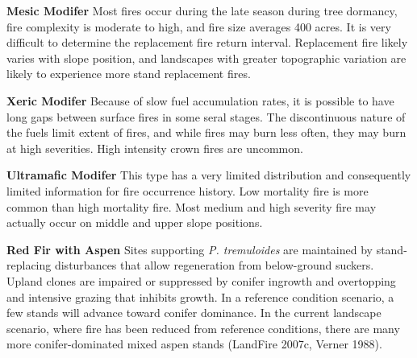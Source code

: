\begin{adjustwidth}{2cm}{}
\textbf{Mesic Modifer } Most fires occur during the late season during tree dormancy, fire complexity is moderate to high, and fire size averages 400 acres. It is very difficult to determine the replacement fire return interval. Replacement fire likely varies with slope position, and landscapes with greater topographic variation are likely to experience more stand replacement fires.

\textbf{Xeric Modifer} Because of slow fuel accumulation rates, it is possible to have long gaps between surface fires in some seral stages. The discontinuous nature of the fuels limit extent of fires, and while fires may burn less often, they may burn at high severities. High intensity crown fires are uncommon.

\textbf{Ultramafic Modifer} This type has a very limited distribution and consequently limited information for fire occurrence history. Low mortality fire is more common than high mortality fire. Most medium and high severity fire may actually occur on middle and upper slope positions.

\end{adjustwidth}

\textbf{Red Fir with Aspen} Sites supporting \emph{P. tremuloides} are maintained by stand-replacing disturbances that allow regeneration from below-ground suckers. Upland clones are impaired or suppressed by conifer ingrowth and overtopping and intensive grazing that inhibits growth. In a reference condition scenario, a few stands will advance toward conifer dominance. In the current landscape scenario, where fire has been reduced from reference conditions, there are many more conifer-dominated mixed aspen stands (LandFire 2007c, Verner 1988).


